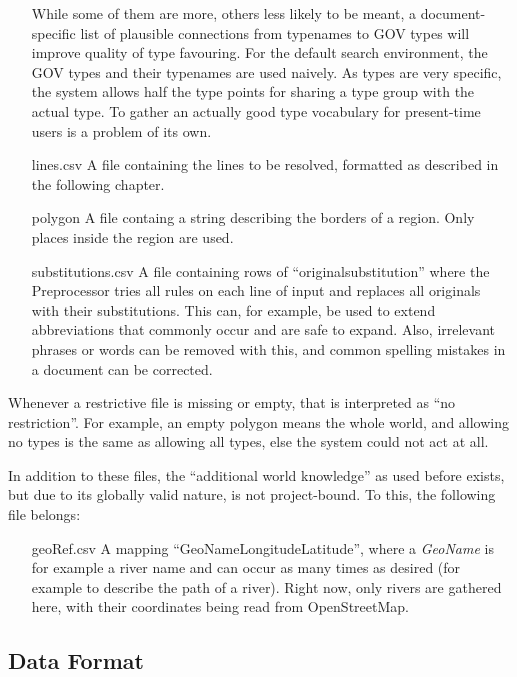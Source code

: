 \documentclass[11pt]{article}
\begin{document}
\begin{itemize}
While some of them are more, others less likely to be meant, a document-specific list of plausible connections from typenames to GOV types will improve quality of type favouring. For the default search environment, the GOV types and their typenames are used naively. As types are very specific, the system allows half the type points for sharing a type group with the actual type. To gather an actually good type vocabulary for present-time users is a problem of its own.
\item[lines.csv] A file containing the lines to be resolved, formatted as described in the following chapter.
\item[polygon] A file containg a string describing the borders of a region. Only places inside the region are used.
\item[substitutions.csv] A file containing rows of ``original\textbar substitution'' where the Preprocessor tries all rules on each line of input and replaces all originals with their substitutions. This can, for example, be used to extend abbreviations that commonly occur and are safe to expand. Also, irrelevant phrases or words can be removed with this, and common spelling mistakes in a document can be corrected.
\end{itemize}

Whenever a restrictive file is missing or empty, that is interpreted as ``no restriction''. For example, an empty polygon means the whole world, and allowing no types is the same as allowing all types, else the system could not act at all.

In addition to these files, the ``additional world knowledge'' as used before exists, but due to its globally valid nature, is not project-bound. To this, the following file belongs:

\begin{itemize}
\item[geoRef.csv] A mapping ``GeoName\textbar Longitude\textbar Latitude'', where a \emph{GeoName} is for example a river name and can occur as many times as desired (for example to describe the path of a river). Right now, only rivers are gathered here, with their coordinates being read from OpenStreetMap.
\end{itemize}

\newpage
\subsection{Data Format}
\end{document}
